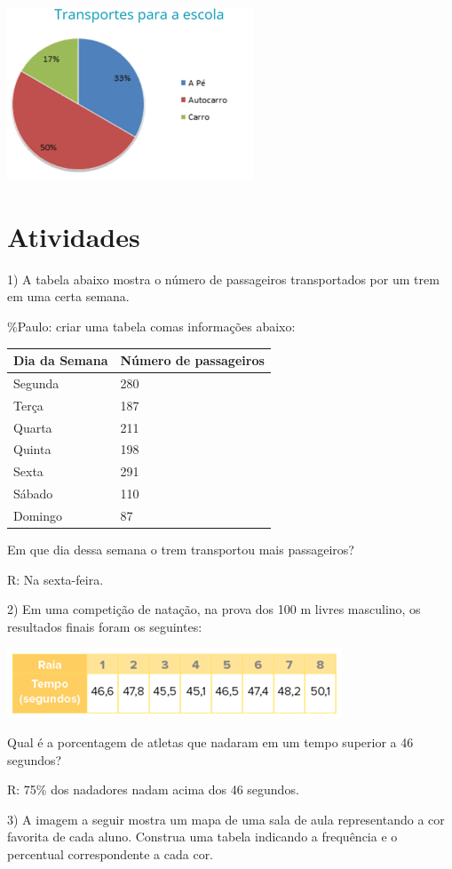 \includegraphics[width=2.88542in,height=2.03125in]{./imgSAEB_6_MAT/media/image80.png}

\section{Atividades}

1) A tabela abaixo mostra o número de passageiros transportados por um
trem em uma certa semana.

\%Paulo: criar uma tabela comas informações abaixo:

\begin{longtable}[]{@{}ll@{}}
\toprule
Dia da Semana & Número de passageiros\tabularnewline
\midrule
\endhead
Segunda & 280\tabularnewline
Terça & 187\tabularnewline
Quarta & 211\tabularnewline
Quinta & 198\tabularnewline
Sexta & 291\tabularnewline
Sábado & 110\tabularnewline
Domingo & 87\tabularnewline
\bottomrule
\end{longtable}

Em que dia dessa semana o trem transportou mais passageiros?

R: Na sexta-feira.

2) Em uma competição de natação, na prova dos 100 m livres masculino, os
resultados finais foram os seguintes:

\includegraphics[width=3.92708in,height=0.8125in]{./imgSAEB_6_MAT/media/image81.png}

Qual é a porcentagem de atletas que nadaram em um tempo superior a 46
segundos?

R: 75\% dos nadadores nadam acima dos 46 segundos.

3) A imagem a seguir mostra um mapa de uma sala de aula representando a
cor favorita de cada aluno. Construa uma tabela indicando a frequência e
o percentual correspondente a cada cor.


